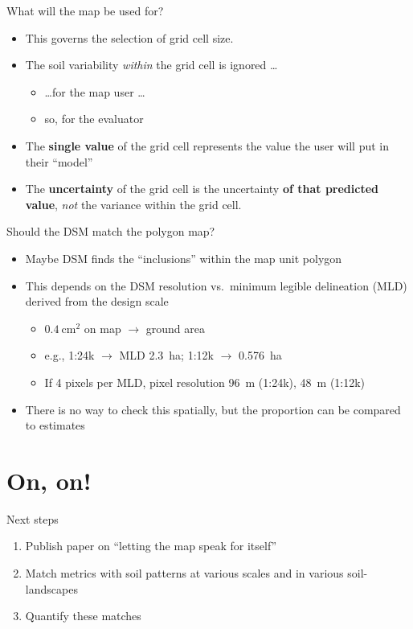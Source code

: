 \documentclass[aspectratio=169, 10pt]{beamer}
\begin{document}
\begin{frame}{What will the map be used for?}
    \begin{itemize}
        \item This governs the selection of grid cell size.
        \item The soil variability \emph{within} the grid cell is ignored \ldots
        \begin{itemize}
            \item \ldots for the map user \ldots
            \item so, for the evaluator
        \end{itemize}
        \item The \textbf{single value} of the grid cell represents the value the user will put in their ``model''
        \item The \textbf{uncertainty} of the grid cell is the uncertainty \textbf{of that predicted value}, \emph{not} the variance within the grid cell.
    \end{itemize}
\end{frame}

\begin{frame}{Should the DSM match the polygon map?}
    \begin{itemize}
        \item Maybe DSM finds the ``inclusions'' within the map unit polygon
        \item This depends on the DSM resolution vs.\ minimum legible delineation (MLD) derived from the design scale
        \begin{itemize}
            \item $0.4~\mathrm{cm}^2$ on map $\to$ ground area
            \item e.g., 1:24k $\to$ MLD 2.3~ha; 1:12k $\to$ 0.576~ha
            \item If 4 pixels per MLD, pixel resolution 96~m (1:24k), 48~m (1:12k)
        \end{itemize}
        \item There is no way to check this spatially, but the proportion can be compared to estimates
    \end{itemize}
  \end{frame}
  
\section{On, on!}

\begin{frame}{Next steps}
\begin{enumerate}
    \item Publish paper on ``letting the map speak for itself''
    \item Match metrics with soil patterns at various scales and in various soil-landscapes
    \item Quantify these matches
\end{enumerate}
\end{frame}
\end{document}
